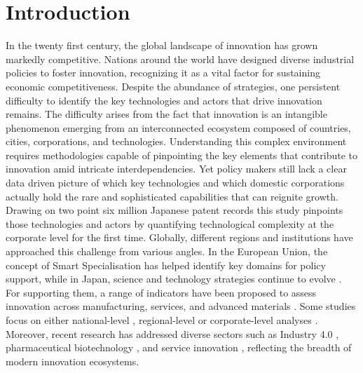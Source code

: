 \section*{Introduction}
{}
\label{section:Introduction}


In the twenty first century, the global landscape of innovation has grown markedly competitive. 
Nations around the world have designed diverse industrial policies to foster innovation, recognizing it as a vital factor for sustaining economic competitiveness. 
Despite the abundance of strategies, one persistent difficulty to identify the key technologies and actors that drive innovation remains. 
The difficulty arises from the fact that innovation is an intangible phenomenon emerging from an interconnected ecosystem composed of countries, cities, corporations, and technologies. 
Understanding this complex environment requires methodologies capable of pinpointing the key elements that contribute to innovation amid intricate interdependencies.
Yet policy makers still lack a clear data driven picture of which key technologies and which domestic corporations actually hold the rare and sophisticated capabilities that can reignite growth. Drawing on two point six million Japanese patent records this study pinpoints those technologies and actors by quantifying technological complexity at the corporate level for the first time.
Globally, different regions and institutions have approached this challenge from various angles. 
In the European Union, the concept of Smart Specialisation \cite{EC_SSP_nodate,Teixeira2022} has helped identify key domains for policy support, while in Japan, science and technology strategies continue to evolve \cite{NISTEP_nodate}. For supporting them, a range of indicators have been proposed to assess innovation across manufacturing, services, and advanced materials \cite{Taques2021,Farcal2023}. 
Some studies focus on either national-level \cite{Teixeira2022,Abay2024}, regional-level \cite{Balland2018,PintarScherngell2022,Pinheiro2022,Whittle2019} or corporate-level analyses \cite{Bruno2018,Buccellato2016,Kito2018}. 
Moreover, recent research has addressed diverse sectors such as Industry 4.0 \cite{Teixeira2022}, pharmaceutical biotechnology \cite{Sakakibara2014,Nakamura2022,Bhatia2018,Murakami2024}, and service innovation \cite{Taques2021}, reflecting the breadth of modern innovation ecosystems.
